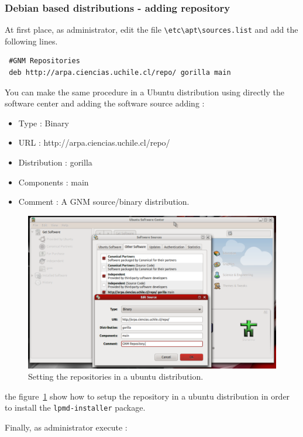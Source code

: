 \subsubsection{Debian based distributions - adding repository}
At first place, as administrator, edit the file \verb|\etc\apt\sources.list|
and add the following lines.

\begin{verbatim}
 #GNM Repositories
 deb http://arpa.ciencias.uchile.cl/repo/ gorilla main
\end{verbatim}

You can make the same procedure in a Ubuntu distribution using directly the
software center and adding the software source adding :

\begin{itemize}
 \item Type : Binary
 \item URL : http://arpa.ciencias.uchile.cl/repo/
 \item Distribution : gorilla
 \item Components : main
 \item Comment : A GNM source/binary distribution.
\end{itemize}

\begin{figure}[h!]
\centering
 \includegraphics[scale=.35]{repository.pdf}
\caption{Setting the repositories in a ubuntu distribution.}
\label{fig:repository}
\end{figure}

\noindent
the figure~\ref{fig:repository} show how to setup the repository in a ubuntu
distribution in order to install the \verb|lpmd-installer| package.

Finally, as administrator execute :

